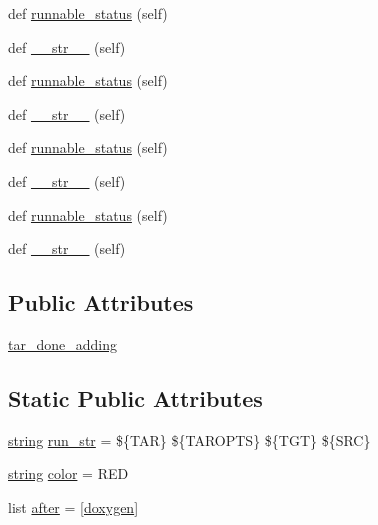 \begin{DoxyCompactItemize}
\item 
def \hyperlink{classwaflib_1_1extras_1_1doxygen_1_1tar_ab00fcc1c9916ad5302e0483869c00014}{runnable\+\_\+status} (self)
\item 
def \hyperlink{classwaflib_1_1extras_1_1doxygen_1_1tar_ad6afde29277bb81c32d8bb60b1409240}{\+\_\+\+\_\+str\+\_\+\+\_\+} (self)
\item 
def \hyperlink{classwaflib_1_1extras_1_1doxygen_1_1tar_ab00fcc1c9916ad5302e0483869c00014}{runnable\+\_\+status} (self)
\item 
def \hyperlink{classwaflib_1_1extras_1_1doxygen_1_1tar_ad6afde29277bb81c32d8bb60b1409240}{\+\_\+\+\_\+str\+\_\+\+\_\+} (self)
\item 
def \hyperlink{classwaflib_1_1extras_1_1doxygen_1_1tar_ab00fcc1c9916ad5302e0483869c00014}{runnable\+\_\+status} (self)
\item 
def \hyperlink{classwaflib_1_1extras_1_1doxygen_1_1tar_ad6afde29277bb81c32d8bb60b1409240}{\+\_\+\+\_\+str\+\_\+\+\_\+} (self)
\item 
def \hyperlink{classwaflib_1_1extras_1_1doxygen_1_1tar_ab00fcc1c9916ad5302e0483869c00014}{runnable\+\_\+status} (self)
\item 
def \hyperlink{classwaflib_1_1extras_1_1doxygen_1_1tar_ad6afde29277bb81c32d8bb60b1409240}{\+\_\+\+\_\+str\+\_\+\+\_\+} (self)
\end{DoxyCompactItemize}
\subsection*{Public Attributes}
\begin{DoxyCompactItemize}
\item 
\hyperlink{classwaflib_1_1extras_1_1doxygen_1_1tar_a9697fe6cf03d445d0d9c5df25b8f90b1}{tar\+\_\+done\+\_\+adding}
\end{DoxyCompactItemize}
\subsection*{Static Public Attributes}
\begin{DoxyCompactItemize}
\item 
\hyperlink{test__lib_f_l_a_c_2format_8c_ab02026ad0de9fb6c1b4233deb0a00c75}{string} \hyperlink{classwaflib_1_1extras_1_1doxygen_1_1tar_ada1adbaf9b445b680c0f8b94eca77f23}{run\+\_\+str} = \textquotesingle{}\$\{T\+AR\} \$\{T\+A\+R\+O\+P\+TS\} \$\{T\+GT\} \$\{S\+RC\}\textquotesingle{}
\item 
\hyperlink{test__lib_f_l_a_c_2format_8c_ab02026ad0de9fb6c1b4233deb0a00c75}{string} \hyperlink{classwaflib_1_1extras_1_1doxygen_1_1tar_ade6dc7ab8aa5fe7246224356051e3b05}{color} = \textquotesingle{}R\+ED\textquotesingle{}
\item 
list \hyperlink{classwaflib_1_1extras_1_1doxygen_1_1tar_a665652f06b77bd20d26d64bd7e9e7fa6}{after} = \mbox{[}\textquotesingle{}\hyperlink{classwaflib_1_1extras_1_1doxygen_1_1doxygen}{doxygen}\textquotesingle{}\mbox{]}
\end{DoxyCompactItemize}


